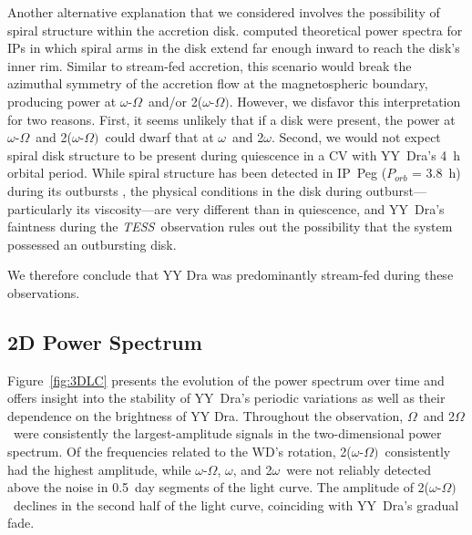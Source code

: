 \documentclass[twocolumn]{aastex63}
\newcommand{\orbit}{$\Omega$}
\newcommand{\spin}{$\omega$}
\newcommand{\beat}{$\omega$-$\Omega$}
\newcommand{\doubleorbit}{2$\Omega$}
\newcommand{\doublespin}{2$\omega$}
\newcommand{\doublebeat}{2($\omega$-$\Omega)$}
\newcommand{\TESS}{\textit{TESS}}
\begin{document}
Another alternative explanation that we considered involves the possibility of spiral structure within the accretion disk. \citet{murray} computed theoretical power spectra for IPs in which spiral arms in the disk extend far enough inward to reach the disk's inner rim. Similar to stream-fed accretion, this scenario would break the azimuthal symmetry of the accretion flow at the magnetospheric boundary, producing power at \beat\ and/or \doublebeat. However, we disfavor this interpretation for two reasons. First, it seems unlikely that if a disk were present, the power at \beat\ and \doublebeat\ could dwarf that at \spin\ and \doublespin. Second, we would not expect spiral disk structure to be present during quiescence in a CV with YY~Dra's 4~h orbital period. While spiral structure has been detected in IP~Peg ($P_{orb}$ = 3.8~h) during its outbursts \citep{steeghs97}, the physical conditions in the disk during outburst---particularly its viscosity---are very different than in quiescence, and YY~Dra's faintness during the \TESS\ observation rules out the possibility that the system possessed an outbursting disk. 

We therefore conclude that YY Dra was predominantly stream-fed during these observations.



\subsection{2D Power Spectrum}
\label{sec:2Dpower}

Figure~\ref{fig:3DLC} presents the evolution of the power spectrum over time and offers insight into the stability of YY~Dra's periodic variations as well as their dependence on the brightness of YY Dra. Throughout the observation, \orbit\ and \doubleorbit\ were consistently the largest-amplitude signals in the two-dimensional power spectrum. Of the frequencies related to the WD's rotation, \doublebeat\ consistently had the highest amplitude, while \beat, \spin, and \doublespin\ were not reliably detected above the noise in 0.5~day segments of the light curve. The amplitude of \doublebeat\ declines in the second half of the light curve, coinciding with YY~Dra's gradual fade.
\end{document}
